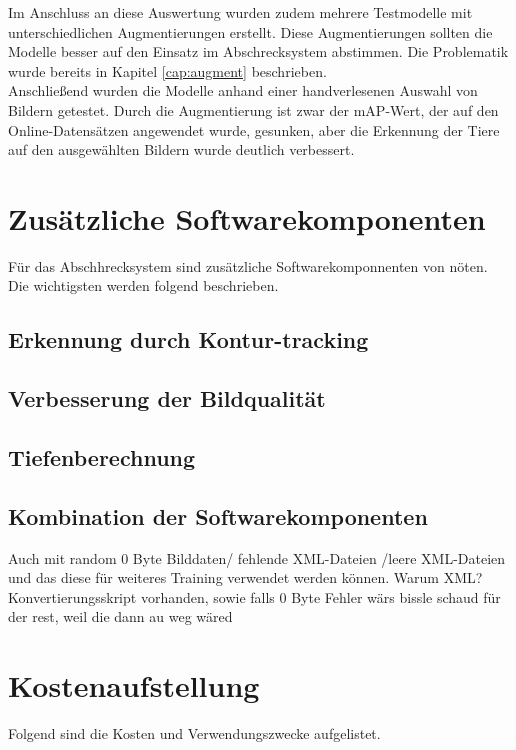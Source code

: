 Im Anschluss an diese Auswertung wurden zudem mehrere Testmodelle mit unterschiedlichen Augmentierungen erstellt. Diese Augmentierungen sollten die Modelle besser auf den Einsatz im Abschrecksystem abstimmen. Die Problematik wurde bereits in Kapitel \ref{cap:augment} beschrieben.
\\
Anschließend wurden die Modelle anhand einer handverlesenen Auswahl von Bildern getestet. Durch die Augmentierung ist zwar der \ac{mAP}-Wert, der auf den Online-Datensätzen angewendet wurde, gesunken, aber die Erkennung der Tiere auf den ausgewählten Bildern wurde deutlich verbessert.

\section{Zusätzliche Softwarekomponenten}

Für das Abschhrecksystem sind zusätzliche Softwarekomponnenten von nöten. Die wichtigsten werden folgend beschrieben.

\subsection{Erkennung durch Kontur-tracking}

\subsection{Verbesserung der Bildqualität}

\subsection{Tiefenberechnung} \label{cap:calc_depth}

\subsection{Kombination der Softwarekomponenten}
Auch mit random 0 Byte Bilddaten/ fehlende XML-Dateien /leere XML-Dateien und das diese für weiteres Training verwendet werden können. Warum XML? Konvertierungsskript vorhanden, sowie falls 0 Byte Fehler wärs bissle schaud für der rest, weil die dann au weg wäred

\section{Kostenaufstellung}

Folgend sind die Kosten und Verwendungszwecke aufgelistet. 

